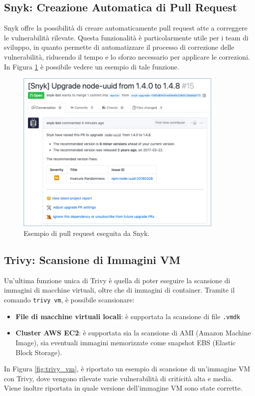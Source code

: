 \subsection{Snyk: Creazione Automatica di Pull Request}
Snyk offre la possibilità di creare automaticamente pull request atte a correggere le vulnerabilità rilevate. Questa funzionalità è particolarmente utile per i team di sviluppo, in quanto permette di automatizzare il processo di correzione delle vulnerabilità, riducendo il tempo e lo sforzo necessario per applicare le correzioni. In Figura \ref{fig:snyk_pr} è possibile vedere un esempio di tale funzione.
\begin{figure}[H]
   \centering
   \includegraphics[width=0.9\textwidth]{immagini/capitolo2/snyk_pr.png}
   \caption{Esempio di pull request eseguita da Snyk.}
   \label{fig:snyk_pr}
\end{figure}

\subsection{Trivy: Scansione di Immagini VM}
Un'ultima funzione unica di Trivy è quella di poter eseguire la scansione di immagini di macchine virtuali, oltre che di immagini di container. Tramite il comando \texttt{trivy vm}, è possibile scansionare:
\begin{itemize}
   \item\textbf{File di macchine virtuali locali}: è supportata la scansione di file \texttt{.vmdk}
   \item\textbf{Cluster AWS EC2}: è supportata sia la scansione di AMI (Amazon Machine Image), sia eventuali immagini memorizzate come snapshot EBS (Elastic Block Storage).
\end{itemize}
In Figura \ref{fig:trivy_vm}, è riportato un esempio di scansione di un'immagine VM con Trivy, dove vengono rilevate varie vulnerabilità di criticità alta e media. Viene inoltre riportata in quale versione dell'immagine VM sono state corrette.

